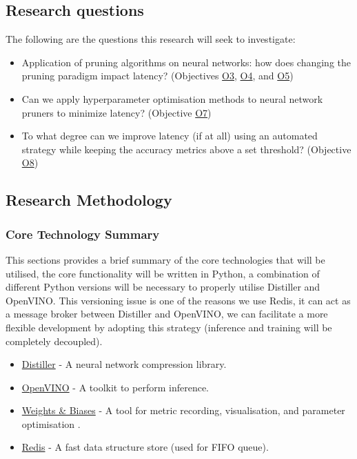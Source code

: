 \documentclass[../D1.tex]{subfiles}
\begin{document}
\subsection{Research questions}
The following are the questions this research will seek to investigate:

\begin{itemize}
    \item Application of pruning algorithms on neural networks: how does changing the pruning paradigm impact latency? (Objectives \hyperref[obj:EvalE2E]{O3}, \hyperref[obj:EvalLayer]{O4}, and \hyperref[obj:EvalComp]{O5})
    \item Can we apply hyperparameter optimisation methods to neural network pruners to minimize latency? (Objective \hyperref[obj:CompPara]{O7})
    \item To what degree can we improve latency (if at all) using an automated strategy while keeping the accuracy metrics above a set threshold? (Objective \hyperref[obj:TestOpt]{O8})
\end{itemize}

\subsection{Research Methodology}
\subsubsection{Core Technology Summary}
This sections provides a brief summary of the core technologies that will be utilised, the core functionality will be written in Python, a combination of different Python versions will be necessary to properly utilise Distiller and OpenVINO.
This versioning issue is one of the reasons we use Redis, it can act as a message broker between Distiller and OpenVINO, we can facilitate a more flexible development by adopting this strategy (inference and training will be completely decoupled).  
\begin{itemize}
    \item \href{https://github.com/IntelLabs/distiller}{Distiller} - A neural network compression library.
    \item \href{https://github.com/openvinotoolkit/openvino}{OpenVINO} - A toolkit to perform inference.
    \item \href{https://github.com/wandb/client}{Weights \& Biases} - A tool for metric recording, visualisation, and parameter optimisation \autocite{biewaldExperimentTrackingWeights}.
    \item \href{https://redis.io/}{Redis} - A fast data structure store (used for FIFO queue).
\end{itemize}
\end{document}
